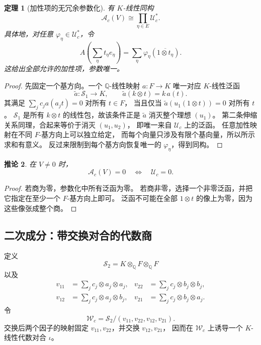 \documentclass[11pt,a4paper,oneside,openany]{book}
\theoremstyle{lecture}
\newtheorem{theorem}{定理}[section]
\newtheorem{corollary}[theorem]{推论}
\newcommand{\Q}{\mathbb Q}
\newcommand{\Uc}{\mathscr U_c}
\newcommand{\Wc}{\mathscr W_c}
\numberwithin{equation}{section}
\begin{document}
\begin{theorem}[加性项的无冗余参数化]\label{lin:thm:addtensor}
有 $K$-线性同构
\begin{equation}\label{lin:eq:addtensor}
 \mathcal A_c(V)\cong\prod_{\eta\in E}\Uc^*.
\end{equation}
具体地，对任意 $\varphi_\eta\in\Uc^*$，令
\[
 A\!\left(\sum_\eta t_\eta e_\eta\right)
 =\sum_\eta\varphi_\eta\!\left(\overline{1\otimes t_\eta}\right).
\]
这给出全部允许的加性项，参数唯一。
\end{theorem}
\begin{proof}
先固定一个基方向。一个 $\Q$-线性映射 $a:F\to K$ 唯一对应
$K$-线性泛函
\[
 \widetilde a:\mathscr S_1\to K,\qquad
 \widetilde a(k\otimes t)=k\,a(t).
\]
其满足 $\sum_jc_ja(a_jt)=0$ 对所有 $t\in F$，
当且仅当 $\widetilde a(u_1(1\otimes t))=0$ 对所有 $t$。
$\mathscr S_1$ 是所有 $k\otimes t$ 的线性包，故该条件正是
$\widetilde a$ 消灭整个理想 $(u_1)$。
第二条伸缩关系同理，合起来等价于消灭 $(u_1,u_2)$，
即唯一来自 $\Uc$ 上的泛函。
任意加性映射在不同 $F$-基方向上可以独立给定，
而每个向量只涉及有限个基向量，所以所示求和有意义。
反过来限制到每个基方向恢复唯一的 $\varphi_\eta$，得到同构。
\end{proof}

\begin{corollary}\label{lin:cor:addnonzero}
在 $V\ne0$ 时，
\[
 \mathcal A_c(V)=0\quad\Longleftrightarrow\quad\Uc=0.
\]
\end{corollary}
\begin{proof}
若商为零，参数化中所有泛函为零。
若商非零，选择一个非零泛函，并把它指定在至少一个 $F$-基方向上即可。
泛函不可能在全部 $1\otimes t$ 的像上为零，因为这些像张成整个商。
\end{proof}

\subsection{二次成分：带交换对合的代数商}
定义
\[
 \mathscr S_2=K\otimes_{\Q}F\otimes_{\Q}F
\]
以及
\[
 \begin{aligned}
 v_{11}&=\sum_jc_j\otimes a_j\otimes a_j,&
 v_{22}&=\sum_jc_j\otimes b_j\otimes b_j,\\
 v_{12}&=\sum_jc_j\otimes a_j\otimes b_j,&
 v_{21}&=\sum_jc_j\otimes b_j\otimes a_j.
 \end{aligned}
\]
令
\[
 \Wc=\mathscr S_2/(v_{11},v_{22},v_{12},v_{21}).
\]
交换后两个因子的映射固定 $v_{11},v_{22}$，并交换 $v_{12},v_{21}$，
因而在 $\Wc$ 上诱导一个 $K$-线性代数对合 $\iota$。
\end{document}
